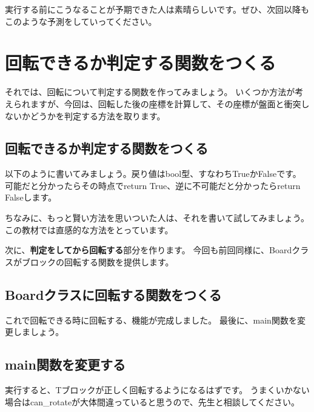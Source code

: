 実行する前にこうなることが予期できた人は素晴らしいです。ぜひ、次回以降もこのような予測をしていってください。

\section{回転できるか判定する関数をつくる}
それでは、回転について判定する関数を作ってみましょう。
いくつか方法が考えられますが、今回は、回転した後の座標を計算して、その座標が盤面と衝突しないかどうかを判定する方法を取ります。
\subsection{回転できるか判定する関数をつくる}
以下のように書いてみましょう。戻り値はbool型、すなわちTrueかFalseです。
可能だと分かったらその時点でreturn True、逆に不可能だと分かったらreturn Falseします。

ちなみに、もっと賢い方法を思いついた人は、それを書いて試してみましょう。
この教材では直感的な方法をとっています。

次に、\textbf{判定をしてから回転する}部分を作ります。
今回も前回同様に、Boardクラスがブロックの回転する関数を提供します。
\subsection{Boardクラスに回転する関数をつくる}

これで回転できる時に回転する、機能が完成しました。
最後に、main関数を変更しましょう。
\subsection{main関数を変更する}

実行すると、Tブロックが正しく回転するようになるはずです。
うまくいかない場合はcan\_rotateが大体間違っていると思うので、先生と相談してください。

